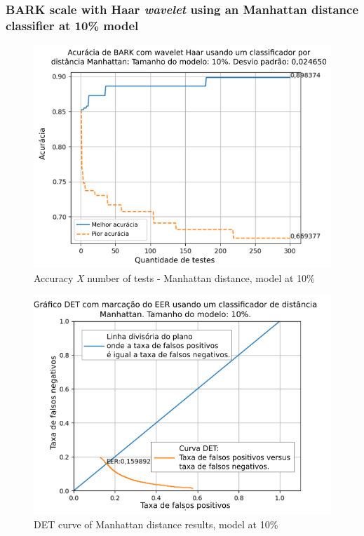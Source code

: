 		\subsubsection{BARK scale with Haar \textit{wavelet} using an Manhattan distance classifier at 10\% model}
			
			
			
			\begin{figure}[ht]
				\centering
				\includegraphics[width=\linewidth]{images/results/confusionMatrices/classifier_Manhattan_10.png}
				\caption{Accuracy \textit{X} number of tests - Manhattan distance, model at 10\%}
				\label{fig:classifiermanhattan10}
			\end{figure}
			
			\begin{figure}[!ht]
				\centering
				\includegraphics[width=\linewidth]{images/results/det/DET_for_classifier_Manhattan_10}
				\caption{DET curve of Manhattan distance results, model at 10\%}
				\label{fig:detforclassifiermanhattan10}
			\end{figure}
		
